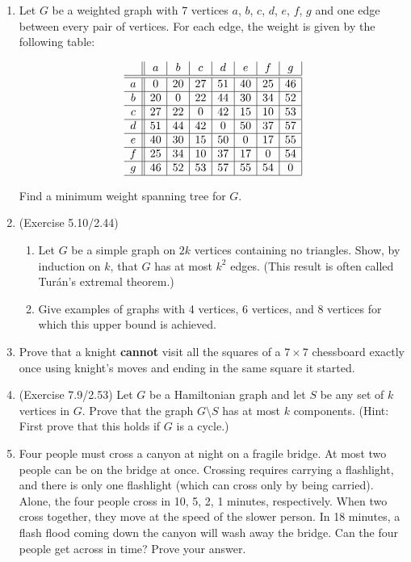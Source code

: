 \documentclass{article}
\begin{document}
\begin{enumerate}

\item Let $G$ be a weighted graph with 7 vertices $a$, $b$, $c$, $d$, $e$, $f$, $g$ and one edge between every pair of vertices. For each edge, the weight is given by the following table:

\[
\begin{array}{c||c|c|c|c|c|c|c|}
  & a & b & c & d & e & f & g \\
\hline \hline
a & 0 & 20 & 27 & 51 & 40 & 25 & 46 \\
\hline  
b & 20 & 0 & 22 & 44 & 30 & 34 & 52 \\
\hline   
c & 27 & 22 & 0 & 42 & 15 & 10 & 53 \\
\hline 
d & 51 & 44 & 42 & 0 & 50 & 37 & 57 \\
\hline 
e & 40 & 30 & 15 & 50 & 0 & 17 & 55 \\
\hline  
f & 25 & 34 & 10 & 37 & 17 & 0 & 54 \\
\hline   
g & 46 & 52 & 53 & 57 & 55 & 54 & 0 \\
\hline    
\end{array}
\]

Find a minimum weight spanning tree for $G$.

\item  (Exercise 5.10/2.44)
	\begin{enumerate}
		\item Let $G$ be a simple graph on $2k$ vertices containing no triangles. Show, by induction on $k$, that $G$ has at most $k^2$ edges. (This result is often called Tur\'an’s extremal theorem.)
		\item Give examples of graphs with 4 vertices, 6 vertices, and 8 vertices for which this upper bound is achieved.
	\end{enumerate}

\item Prove that a knight {\bf cannot} visit all the squares of a $7 \times 7$ chessboard exactly once using knight’s moves and ending in the same square it started.

\item (Exercise 7.9/2.53) Let $G$ be a Hamiltonian graph and let $S$ be any set of $k$ vertices in $G$. Prove that the graph $G\setminus S$ has at most $k$ components. (Hint: First prove that this holds if $G$ is a cycle.)

\item Four people must cross a canyon at night on a fragile bridge. At most two people can be on the bridge at once. Crossing requires carrying a flashlight, and there is only one flashlight (which can cross only by being carried). Alone, the four people cross in 10, 5, 2, 1 minutes, respectively. When two cross together, they move at the speed of the slower person. In 18 minutes, a flash flood coming down the canyon will wash away the bridge. Can the four people get across in time? Prove your answer.

\end{enumerate}
\end{document}
